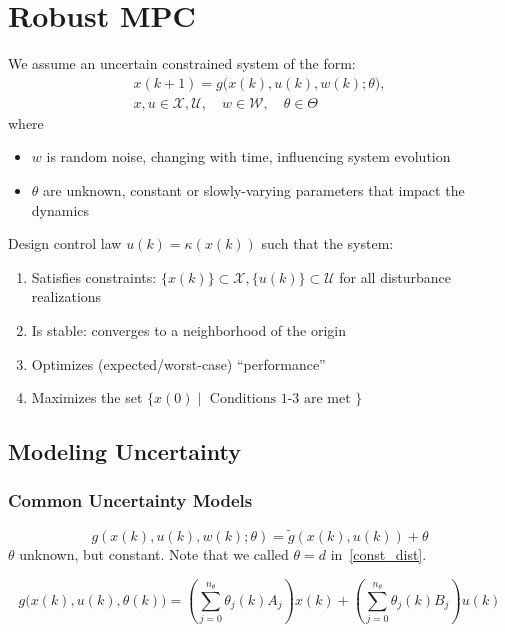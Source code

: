 \section{Robust MPC}
We assume an uncertain constrained system of the form:
\begin{gather*}
    x(k + 1) = g\bigl(x(k), u(k), w(k); \theta\bigr),\\
    x, u \in \mathcal{X}, \mathcal{U}, \quad w \in \mathcal{W}, \quad \theta \in \Theta
\end{gather*}
where
\begin{itemize}
    \item $w$ is random noise, changing with time, influencing system evolution
    \item $\theta$ are unknown, constant or slowly-varying parameters that impact the dynamics
\end{itemize}
\newpar{}

Design control law $u(k) = \kappa(x(k))$ such that the system:
\begin{enumerate}
    \item Satisfies constraints: $\{x(k)\} \subset \mathcal{X}, \{u(k)\} \subset \mathcal{U}$ for all disturbance realizations
    \item Is stable: converges to a neighborhood of the origin
    \item Optimizes (expected/worst-case) ``performance''
    \item Maximizes the set $\{x(0) \mid \text{ Conditions 1-3 are met }\}$
\end{enumerate}

\subsection{Modeling Uncertainty}
\subsubsection{Common Uncertainty Models}

\begin{equation*}
    g(x(k), u(k), w(k); \theta) = \widetilde{g}(x(k), u(k)) + \theta
\end{equation*}
$\theta$ unknown, but constant. Note that we called $\theta = d$ in~\ref{const_dist}.

\newpar{}

{\small
    \begin{equation*}
        g\bigl(x(k), u(k), \theta(k)\bigr) =
        \left( \sum_{j=0}^{n_\theta} \theta_j(k) A_j \right)x(k) +
        \left( \sum_{j=0}^{n_\theta} \theta_j(k) B_j \right)u(k)
    \end{equation*}
}

